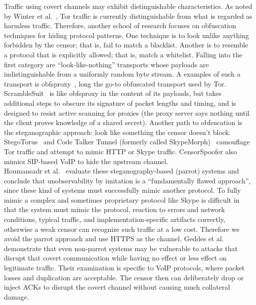 \documentclass{article}  usepackage{url}
\begin{document}
Traffic using covert channels may exhibit distinguishable characteristics. As
noted by Winter et al.~\cite{foci12-winter}, Tor traffic is currently
distinguishable from what is regarded as harmless traffic. Therefore, another
school of research focuses on obfuscation techniques for hiding protocol
patterns. One technique is to look unlike anything forbidden by the censor; that
is, fail to match a blacklist. Another is to resemble a protocol that is
explicitly allowed; that is, match a whitelist. Falling into the first category
are ``look-like-nothing'' transports whose payloads are indistinguishable from a
uniformly random byte stream. A examples of such a transport is
obfsproxy~\cite{obfsproxy}, long the go-to obfuscated transport used by Tor.
ScrambleSuit~\cite{scramblesuit} is like obfsproxy in the content of its
payloads, but takes additional steps to obscure its signature of packet lengths
and timing, and is designed to resist active scanning for proxies (the proxy
server says nothing until the client proves knowledge of a shared secret).
Another path to obfsucation is the steganographic approach: look like something
the censor doesn't block. StegoTorus~\cite{stegotorus} and Code Talker Tunnel
(formerly called SkypeMorph)~\cite{skypemorph} camouflage Tor traffic and
attempt to mimic HTTP or Skype traffic. CensorSpoofer also mimics SIP-based VoIP
to hide the upstream channel.\\

Houmansadr et al.~\cite{parrot} evaluate these steganography-based (parrot)
systems and conclude that unobservability by imitation is a ``fundamentally
flawed approach'', since these kind of systems must successfully mimic another
protocol. To fully mimic a complex and sometimes proprietary protocol like Skype
is difficult in that the system must mimic the protocol,  reaction to errors and
network conditions, typical traffic, and implementation-specific artifacts
correctly, otherwise a weak censor can recognize such traffic at a low cost.
Therefore we avoid the parrot approach and use HTTPS as the channel. Geddes  et
al.~\cite{acks} demonstrate that even non-parrot systems may be vulnerable to
attacks that disrupt that covert communication while having no effect or less
effect on legitimate traffic. Their examination is specific to VoIP protocols,
where packet losses and duplication are acceptable. The censor then can
deliberately drop or inject ACKs to disrupt the covert channel without causing
much collateral damage.\\
\end{document}
